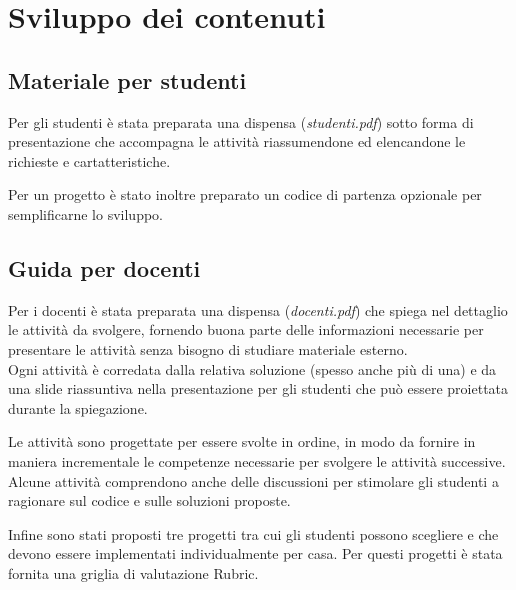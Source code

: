 \documentclass[../../relazione.tex]{subfiles}
\begin{document}
\section{Sviluppo dei contenuti}

\subsection{Materiale per studenti}
Per gli studenti è stata preparata una dispensa (\textit{studenti.pdf}) sotto forma di presentazione che accompagna le attività riassumendone ed elencandone le richieste e cartatteristiche.

Per un progetto è stato inoltre preparato un codice di partenza opzionale per semplificarne lo sviluppo.

\subsection{Guida per docenti}
Per i docenti è stata preparata una dispensa (\textit{docenti.pdf}) che spiega nel dettaglio le attività da svolgere, fornendo buona parte delle informazioni necessarie per presentare le attività senza bisogno di studiare materiale esterno.\\
Ogni attività è corredata dalla relativa soluzione (spesso anche più di una) e da una slide riassuntiva nella presentazione per gli studenti che può essere proiettata durante la spiegazione.

Le attività sono progettate per essere svolte in ordine, in modo da fornire in maniera incrementale le competenze necessarie per svolgere le attività successive. Alcune attività comprendono anche delle discussioni per stimolare gli studenti a ragionare sul codice e sulle soluzioni proposte.

Infine sono stati proposti tre progetti tra cui gli studenti possono scegliere e che devono essere implementati individualmente per casa. Per questi progetti è stata fornita una griglia di valutazione Rubric.
\end{document}
